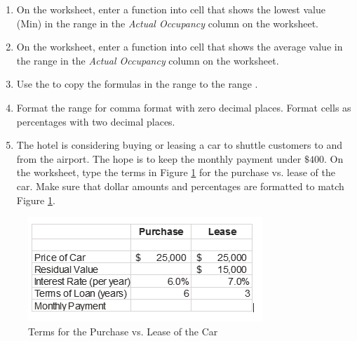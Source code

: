 \begin{enumerate}
	\item On the  worksheet, enter a function into cell  that shows the lowest value (Min) in the range  in the \textit{Actual Occupancy} column on the  worksheet.
	
	\item On the  worksheet, enter a function into cell  that shows the average value in the range  in the \textit{Actual Occupancy} column on the  worksheet.
	
	\item Use the  to copy the formulas in the range  to the range .
	
	\item Format the range  for comma format with zero decimal places. Format cells  as percentages with two decimal places.
	
	\item The hotel is considering buying or leasing a car to shuttle customers to and from the airport. The hope is to keep the monthly payment under $ \$400 $. On the  worksheet, type the terms in Figure \ref{02:fig50} for the purchase vs. lease of the car. Make sure that dollar amounts and percentages are formatted to match Figure \ref{02:fig50}.
	\end{enumerate}

\begin{figure}[H]
	\centering
	\includegraphics[width=\maxwidth{.95\linewidth}]{gfx/ch02_fig50}
	\caption{Terms for the Purchase vs. Lease of the Car}
	\label{02:fig50}
\end{figure}

